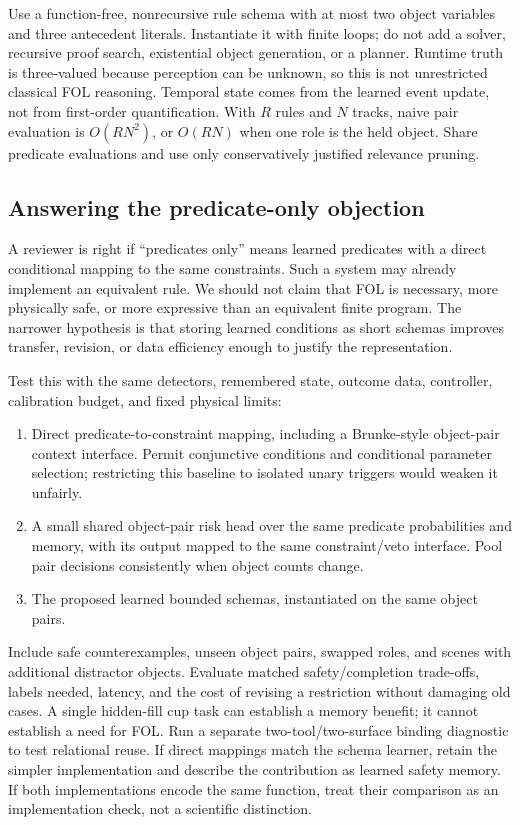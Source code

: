 \documentclass[10pt]{article}
\begin{document}
Use a function-free, nonrecursive rule schema with at most two object variables and three antecedent literals. Instantiate it with finite loops; do not add a solver, recursive proof search, existential object generation, or a planner. Runtime truth is three-valued because perception can be unknown, so this is not unrestricted classical FOL reasoning. Temporal state comes from the learned event update, not from first-order quantification. With $R$ rules and $N$ tracks, naive pair evaluation is $O(RN^2)$, or $O(RN)$ when one role is the held object. Share predicate evaluations and use only conservatively justified relevance pruning.

\subsection{Answering the predicate-only objection}
A reviewer is right if ``predicates only'' means learned predicates with a direct conditional mapping to the same constraints. Such a system may already implement an equivalent rule. We should not claim that FOL is necessary, more physically safe, or more expressive than an equivalent finite program. The narrower hypothesis is that storing learned conditions as short schemas improves transfer, revision, or data efficiency enough to justify the representation.

Test this with the same detectors, remembered state, outcome data, controller, calibration budget, and fixed physical limits:
\begin{enumerate}
\item Direct predicate-to-constraint mapping, including a Brunke-style object-pair context interface. Permit conjunctive conditions and conditional parameter selection; restricting this baseline to isolated unary triggers would weaken it unfairly.
\item A small shared object-pair risk head over the same predicate probabilities and memory, with its output mapped to the same constraint/veto interface. Pool pair decisions consistently when object counts change.
\item The proposed learned bounded schemas, instantiated on the same object pairs.
\end{enumerate}
Include safe counterexamples, unseen object pairs, swapped roles, and scenes with additional distractor objects. Evaluate matched safety/completion trade-offs, labels needed, latency, and the cost of revising a restriction without damaging old cases. A single hidden-fill cup task can establish a memory benefit; it cannot establish a need for FOL. Run a separate two-tool/two-surface binding diagnostic to test relational reuse. If direct mappings match the schema learner, retain the simpler implementation and describe the contribution as learned safety memory. If both implementations encode the same function, treat their comparison as an implementation check, not a scientific distinction.
\end{document}
